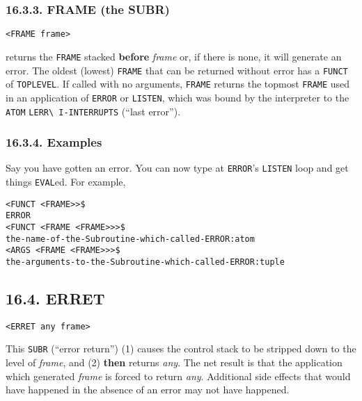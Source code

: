 \documentclass[a4paper,]{article}
\begin{document}
\subsubsection{16.3.3. FRAME (the SUBR)}\label{frame-the-subr}

\begin{verbatim}
<FRAME frame>
\end{verbatim}

 returns the \texttt{FRAME} stacked \textbf{before} \emph{frame} or, if there is none, it will
generate an error. The oldest (lowest) \texttt{FRAME} that can be returned without error has a \texttt{FUNCT} of
\texttt{TOPLEVEL}. If called with no arguments, \texttt{FRAME} returns the topmost
\texttt{FRAME} used in an application of \texttt{ERROR} or \texttt{LISTEN}, which was bound by the interpreter to the
\texttt{ATOM} \texttt{LERR\textbackslash{}\ I-INTERRUPTS} (``last error'').

\subsubsection{16.3.4. Examples}\label{examples-4}

Say you have gotten an error. You can now type at \texttt{ERROR}'s \texttt{LISTEN} loop and get things \texttt{EVAL}ed. For
example,

\begin{verbatim}
<FUNCT <FRAME>>$
ERROR
<FUNCT <FRAME <FRAME>>>$
the-name-of-the-Subroutine-which-called-ERROR:atom
<ARGS <FRAME <FRAME>>>$
the-arguments-to-the-Subroutine-which-called-ERROR:tuple
\end{verbatim}

\subsection{16.4. ERRET}\label{erret}

\begin{verbatim}
<ERRET any frame>
\end{verbatim}

 This \texttt{SUBR} (``error return'') (1) causes the control stack to be stripped down to the
level of \emph{frame}, and (2) \textbf{then} returns \emph{any}. The net result is that the application which generated
\emph{frame} is forced to return \emph{any}. Additional side effects that would have happened in the absence of an error
may not have happened.
\end{document}
